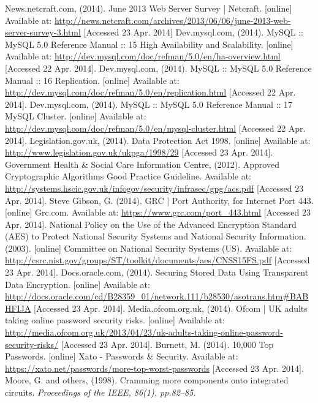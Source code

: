 \documentclass[11pt]{article}
\begin{document}
\begin{thebibliography}{40}
\begin{singlespace}
News.netcraft.com, (2014). June 2013 Web Server Survey | Netcraft. [online] Available at: \url{http://news.netcraft.com/archives/2013/06/06/june-2013-web-server-survey-3.html} [Accessed 23 Apr. 2014]
Dev.mysql.com, (2014). MySQL :: MySQL 5.0 Reference Manual :: 15 High Availability and Scalability. [online] Available at: \url{http://dev.mysql.com/doc/refman/5.0/en/ha-overview.html} [Accessed 22 Apr. 2014].
Dev.mysql.com, (2014). MySQL :: MySQL 5.0 Reference Manual :: 16 Replication. [online] Available at: \url{http://dev.mysql.com/doc/refman/5.0/en/replication.html} [Accessed 22 Apr. 2014].
Dev.mysql.com, (2014). MySQL :: MySQL 5.0 Reference Manual :: 17 MySQL Cluster. [online] Available at: \url{http://dev.mysql.com/doc/refman/5.0/en/mysql-cluster.html} [Accessed 22 Apr. 2014].
Legislation.gov.uk, (2014). Data Protection Act 1998. [online] Available at: \url{http://www.legislation.gov.uk/ukpga/1998/29} [Accessed 23 Apr. 2014].
Government Health \& Social Care Information Centre, (2012). Approved Cryptographic Algorithms Good Practice Guideline. Available at: \url{http://systems.hscic.gov.uk/infogov/security/infrasec/gpg/acs.pdf} [Accessed 23 Apr. 2014].
Steve Gibson, G. (2014). GRC | Port Authority, for Internet Port 443. [online] Grc.com. Available at: \url{https://www.grc.com/port_443.html} [Accessed 23 Apr. 2014].
National Policy on the Use of the Advanced Encryption Standard (AES) to Protect National Security Systems and National Security Information. (2003). [online] Committee on National Security Systems (US). Available at: \url{http://csrc.nist.gov/groups/ST/toolkit/documents/aes/CNSS15FS.pdf} [Accessed 23 Apr. 2014].
Docs.oracle.com, (2014). Securing Stored Data Using Transparent Data Encryption. [online] Available at: \url{http://docs.oracle.com/cd/B28359_01/network.111/b28530/asotrans.htm#BABHFIJA} [Accessed 23 Apr. 2014].
Media.ofcom.org.uk, (2014). Ofcom | UK adults taking online password security risks. [online] Available at: \url{http://media.ofcom.org.uk/2013/04/23/uk-adults-taking-online-password-security-risks/} [Accessed 23 Apr. 2014].
Burnett, M. (2014). 10,000 Top Passwords. [online] Xato - Passwords \& Security. Available at: \url{https://xato.net/passwords/more-top-worst-passwords} [Accessed 23 Apr. 2014].
Moore, G. and others, (1998). Cramming more components onto integrated circuits. \textit{Proceedings of the IEEE, 86(1), pp.82--85.}

\end{singlespace}
\end{thebibliography}
\end{document}

